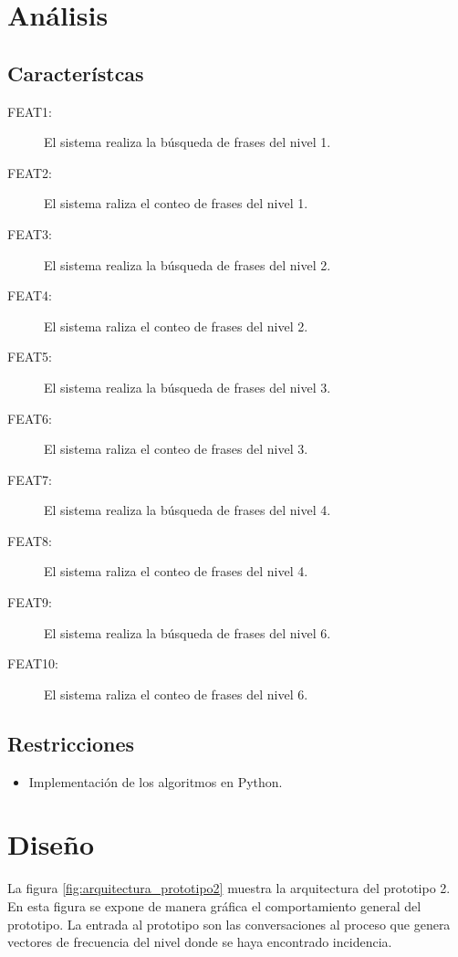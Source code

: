 \section{An\'alisis}
\subsection{Caracter\'istcas}

\begin{description}
\item[FEAT1:] El sistema realiza la b\'usqueda de frases del nivel 1.
\item[FEAT2:] El sistema raliza el conteo de frases del nivel 1.
\item[FEAT3:] El sistema realiza la b\'usqueda de frases del nivel 2.
\item[FEAT4:] El sistema raliza el conteo de frases del nivel 2.
\item[FEAT5:] El sistema realiza la b\'usqueda de frases del nivel 3.
\item[FEAT6:] El sistema raliza el conteo de frases del nivel 3.
\item[FEAT7:] El sistema realiza la b\'usqueda de frases del nivel 4.
\item[FEAT8:] El sistema raliza el conteo de frases del nivel 4.
\item[FEAT9:] El sistema realiza la b\'usqueda de frases del nivel 6.
\item[FEAT10:] El sistema raliza el conteo de frases del nivel 6.
\end{description}

\subsection{Restricciones}
\begin{itemize}
\item Implementaci\'on de los algoritmos en Python.
\end{itemize}

\section{Dise\~no}

La figura \ref{fig:arquitectura_prototipo2} muestra la arquitectura del prototipo 2. En esta figura se expone de manera gr\'afica el comportamiento general del prototipo. La entrada al prototipo son las conversaciones al proceso que genera vectores de frecuencia del nivel donde se haya encontrado incidencia.


